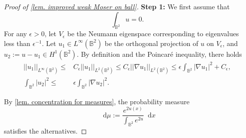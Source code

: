 \documentclass[10pt,a4paper]{amsart}
\newcommand{\dd}{\mathop{}\!\mathrm{d}}
\begin{document}
    \begin{proof}[Proof of \cref{lem. improved weak Moser on ball}]
    {\bf Step 1:} We first assume that
    \[
    \int_{\mathbb{B}^2}u=0.
    \]
    For any $\epsilon>0$, let $V_\epsilon$ be the Neumann eigenspace corresponding to eigenvalues less than $\epsilon^{-1}$. Let $u_1\in L^{\infty}(\mathbb{B}^2)$ be the orthogonal projection of $u$ on $V_\epsilon$, and $u_2:=u-u_1\in H^1(\mathbb{B}^2)$. By definition and the Poincar\'e inequality, there holds
    \begin{align}
        ||u_1||_{L^{\infty}(\mathbb{B}^2)}
        \leq& C_\epsilon 
        ||u_1||_{L^2(\mathbb{B}^2)}
        \leq C_\epsilon ||\nabla u_1||_{L^2(\mathbb{B}^2)}
        \leq \epsilon\int_{\mathbb{B}^2}
        |\nabla u_1|^2
        +C_\epsilon,\label{eq. upper bound of u1}\\
        \int_{\mathbb{B}^2}|u_2|^2
        \leq& \epsilon 
        \int_{\mathbb{B}^2}|\nabla u_2|^2.
        \label{eq. L2 bound of u2}
    \end{align}

    
        By \cref{lem. concentration for measures}, the probability measure
        \[
        \dd\mu:=\frac{e^{2u(x)}}{\int_{\mathbb{B}^2}e^{2u}}\dd x
        \]
        satisfies the alternatives.


\end{proof}
\end{document}
